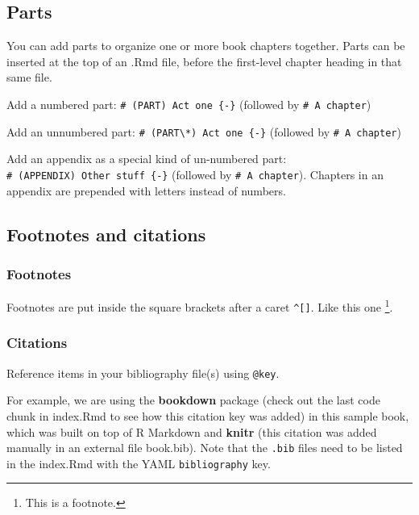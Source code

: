 \documentclass[
]{bxjsbook}
\theoremstyle{definition}
\theoremstyle{definition}
\theoremstyle{definition}
\theoremstyle{definition}
\theoremstyle{remark}
\begin{document}
\hypertarget{parts}{%
\subsection{Parts}\label{parts}}

You can add parts to organize one or more book chapters together. Parts can be inserted at the top of an .Rmd file, before the first-level chapter heading in that same file.

Add a numbered part: \texttt{\#\ (PART)\ Act\ one\ \{-\}} (followed by \texttt{\#\ A\ chapter})

Add an unnumbered part: \texttt{\#\ (PART\textbackslash{}*)\ Act\ one\ \{-\}} (followed by \texttt{\#\ A\ chapter})

Add an appendix as a special kind of un-numbered part: \texttt{\#\ (APPENDIX)\ Other\ stuff\ \{-\}} (followed by \texttt{\#\ A\ chapter}). Chapters in an appendix are prepended with letters instead of numbers.

\hypertarget{footnotes-and-citations}{%
\subsection{Footnotes and citations}\label{footnotes-and-citations}}

\hypertarget{footnotes}{%
\subsubsection{Footnotes}\label{footnotes}}

Footnotes are put inside the square brackets after a caret \texttt{\^{}{[}{]}}. Like this one \footnote{This is a footnote.}.

\hypertarget{citations}{%
\subsubsection{Citations}\label{citations}}

Reference items in your bibliography file(s) using \texttt{@key}.

For example, we are using the \textbf{bookdown} package \citep{R-bookdown} (check out the last code chunk in index.Rmd to see how this citation key was added) in this sample book, which was built on top of R Markdown and \textbf{knitr} \citep{xie2015} (this citation was added manually in an external file book.bib).
Note that the \texttt{.bib} files need to be listed in the index.Rmd with the YAML \texttt{bibliography} key.
\end{document}

